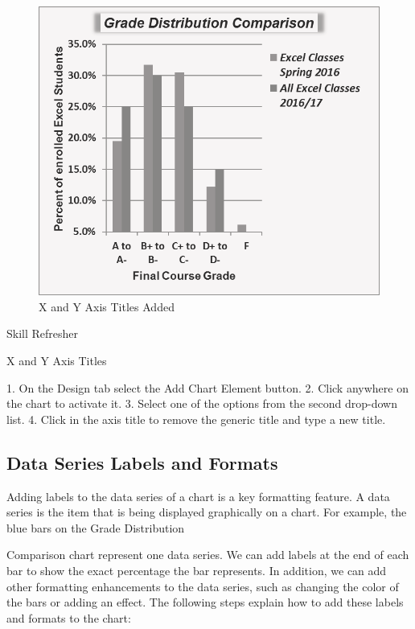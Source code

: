 \begin{figure}[H]
	\centering
	\includegraphics[width=\maxwidth{.95\linewidth}]{gfx/ch04_fig37}
	\caption{X and Y Axis Titles Added}
	\label{04:fig37}
\end{figure}


Skill Refresher


X and Y Axis Titles

1. On the Design tab select the Add Chart Element button.
2. Click anywhere on the chart to activate it.
3. Select one of the options from the second drop-down list.
4. Click in the axis title to remove the generic title and type a new title.



\subsection{Data Series Labels and Formats}

Adding labels to the data series of a chart is a key formatting feature. A data series is the item
that is being displayed graphically on a chart. For example, the blue bars on the Grade Distribution

Comparison chart represent one data series. We can add labels at the end of each bar to show the
exact percentage the bar represents. In addition, we can add other formatting enhancements to the
data series, such as changing the color of the bars or adding an effect. The following steps explain how
to add these labels and formats to the chart:

